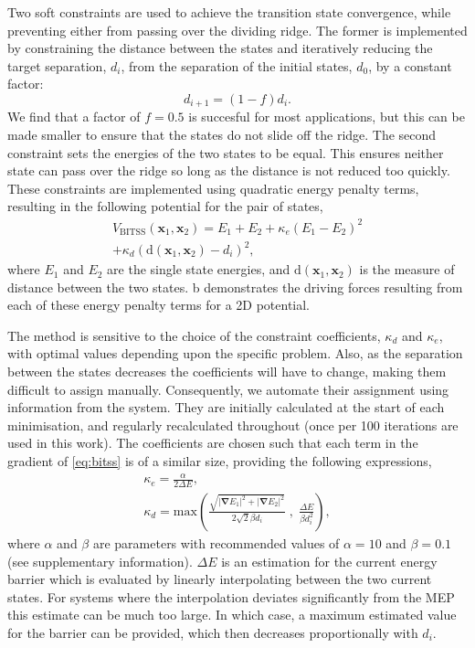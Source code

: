 \documentclass[aps,twocolumn]{revtex4-1}
\begin{document}
\topic Two soft constraints are used to achieve the transition state convergence, while preventing either from passing over the dividing ridge.
The former is implemented by constraining the distance between the states and iteratively reducing the target separation, $d_i$, from the separation of the initial states, $d_0$, by a constant factor:
\begin{equation}
  d_{i+1} = (1 - f) d_i.
  \label{eq:diteration}
\end{equation}
We find that a factor of $f = 0.5$ is succesful for most applications, but this can be made smaller to ensure that the states do not slide off the ridge.
The second constraint sets the energies of the two states to be equal.
This ensures neither state can pass over the ridge so long as the distance is not reduced too quickly.
These constraints are implemented using quadratic energy penalty terms, resulting in the following potential for the pair of states,
\begin{multline}
  V_\text{BITSS}(\bm{x}_1, \bm{x}_2) = E_1 + E_2
    + \kappa_e \left( E_1 - E_2 \right) ^2 \\
    + \kappa_d \left( \mathrm{d}(\bm{x}_1, \bm{x}_2) - d_i \right) ^2,
  \label{eq:bitss}
\end{multline}
where $E_1$ and $E_2$ are the single state energies, and $\mathrm{d}(\bm{x}_1, \bm{x}_2)$ is the measure of distance between the two states.
b demonstrates the driving forces resulting from each of these energy penalty terms for a 2D potential.

\topic The method is sensitive to the choice of the constraint coefficients, $\kappa_d$ and $\kappa_e$, with optimal values depending upon the specific problem.
Also, as the separation between the states decreases the coefficients will have to change, making them difficult to assign manually.
Consequently, we automate their assignment using information from the system.
They are initially calculated at the start of each minimisation, and regularly recalculated throughout (once per 100 iterations are used in this work).
The coefficients are chosen such that each term in the gradient of \cref{eq:bitss} is of a similar size, providing the following expressions,
\begin{gather}
  \kappa_e = \frac {\alpha} {2 \Delta E},
  \label{eq:ke}
  \\
  \kappa_d = \text{max} \left(
    \frac {\sqrt{|\bm{\nabla} E_1|^2 + |\bm{\nabla} E_2|^2}} {2\sqrt{2} \beta d_i} \; , \;
    \frac{\Delta E}{\beta d_i^2} \right),
  \label{eq:kd}
\end{gather}
where $\alpha$ and $\beta$ are parameters with recommended values of $\alpha = 10$ and $\beta = 0.1$ (see supplementary information).
$\Delta E$ is an estimation for the current energy barrier which is evaluated by linearly interpolating between the two current states.
For systems where the interpolation deviates significantly from the MEP this estimate can be much too large.
In which case, a maximum estimated value for the barrier can be provided, which then decreases proportionally with $d_i$.
\end{document}
